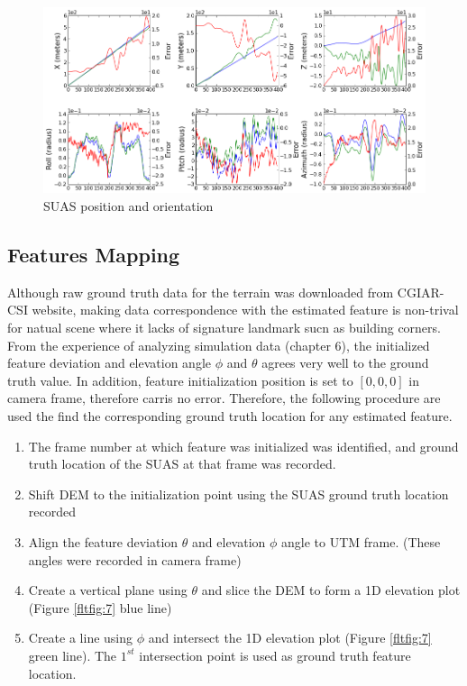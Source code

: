 \begin{figure}[h]
\centering
\includegraphics[width=12cm, keepaspectratio=true]
{./Figures/fltfig/cut1/Figure30.png}
\caption{SUAS position and orientation}
\label{fltfig:6}
\end{figure}
\FloatBarrier
\subsection{Features Mapping}\label{sec:accuracy_features}

Although raw ground truth data for the terrain was downloaded from
\cite{_cgiar-csi_????} CGIAR-CSI website, making data correspondence
with the estimated feature is non-trival for natual scene where it
lacks of signature landmark sucn as building corners. From the
experience of analyzing simulation data (chapter 6), the initialized
feature deviation and elevation angle $\phi$ and $\theta$ agrees very
well to the ground truth value. In addition, feature initialization
position is set to $[0, 0, 0]$ in camera frame, therefore carris no
error. Therefore, the following procedure are used the find the
corresponding ground truth location for any estimated feature. 

\begin{enumerate}
  \item The frame number at which feature was initialized was
  identified, and ground truth location of the SUAS at that frame was
  recorded.
  \item Shift DEM to the initialization point using the SUAS ground
  truth location recorded
  \item Align the feature deviation $\theta$ and elevation $\phi$ angle to UTM frame.
  (These angles were recorded in camera frame)
  \item Create a vertical plane using $\theta$ and slice the DEM to
  form a 1D elevation plot (Figure \ref{fltfig:7} blue line)
  \item Create a line using $\phi$ and intersect the 1D elevation plot
  (Figure \ref{fltfig:7} green line). The $1^{st}$ intersection point
  is used as ground truth feature location.
\end{enumerate}

